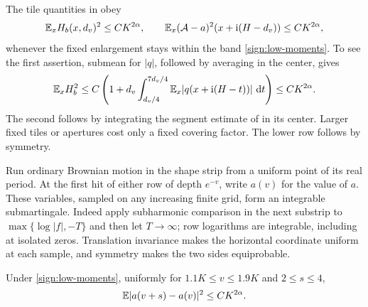 The tile quantities in  obey
\begin{equation}\label{sign:tile-L2}
 \mathbb E_x H_b(x,d_v)^2\le CK^{2\alpha},\qquad
 \mathbb E_x(\mathcal A-a)^2(x+\mathrm i(H-d_v))\le CK^{2\alpha},
\end{equation}
whenever the fixed enlargement stays within the band
\eqref{sign:low-moments}.  To see the first assertion, submean for
\(|q|\), followed by averaging in the center, gives
\[
 \mathbb E_x H_b^2\le C\left(1+
 d_v\int_{d_v/4}^{7d_v/4}
 \mathbb E_x|q(x+\mathrm i(H-t))|\,\,\mathrm d t\right)\le CK^{2\alpha}.
\]
The second follows by integrating the segment estimate of
 in its center.  Larger fixed tiles or apertures
cost only a fixed covering factor.  The lower row follows by symmetry.

Run ordinary Brownian motion in the shape strip from a uniform point
of its real period.  At the first hit of either row of depth \(e^{-v}\),
write \(a(v)\) for the value of \(a\).  These variables, sampled on
any increasing finite grid, form an integrable submartingale.  Indeed
apply subharmonic comparison in the next substrip to
\(\max\{\log|f|,-T\}\) and then let \(T\to\infty\); row logarithms
are integrable, including at isolated zeros.  Translation invariance
makes the horizontal coordinate uniform at each sample, and symmetry
makes the two sides equiprobable.

\begin{lemma}\label{sign:increments}
Under \eqref{sign:low-moments}, uniformly for
\(1.1K\le v\le1.9K\) and \(2\le s\le4\),
\begin{equation}\label{sign:increment-L2}
 \mathbb E|a(v+s)-a(v)|^2\le CK^{2\alpha}.
\end{equation}
\end{lemma}

